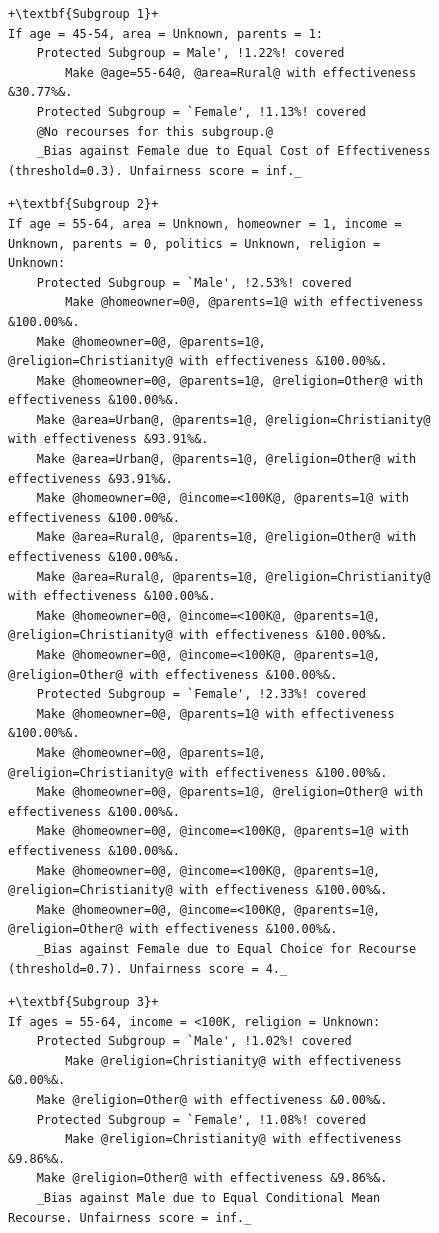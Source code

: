 \documentclass{article}
\begin{document}
\begin{figure}[ht]
\centering
\begin{minipage}{1\linewidth}
\begin{lstlisting}[style = base,escapechar=+]
+\textbf{Subgroup 1}+
If age = 45-54, area = Unknown, parents = 1:
    Protected Subgroup = Male', !1.22%! covered
        Make @age=55-64@, @area=Rural@ with effectiveness &30.77%&.
    Protected Subgroup = `Female', !1.13%! covered
	@No recourses for this subgroup.@
    _Bias against Female due to Equal Cost of Effectiveness (threshold=0.3). Unfairness score = inf._
\end{lstlisting}

\begin{lstlisting}[style = base,escapechar=+]
+\textbf{Subgroup 2}+
If age = 55-64, area = Unknown, homeowner = 1, income = Unknown, parents = 0, politics = Unknown, religion = Unknown:
    Protected Subgroup = `Male', !2.53%! covered
        Make @homeowner=0@, @parents=1@ with effectiveness &100.00%&.
	Make @homeowner=0@, @parents=1@, @religion=Christianity@ with effectiveness &100.00%&.
	Make @homeowner=0@, @parents=1@, @religion=Other@ with effectiveness &100.00%&.
	Make @area=Urban@, @parents=1@, @religion=Christianity@ with effectiveness &93.91%&.
	Make @area=Urban@, @parents=1@, @religion=Other@ with effectiveness &93.91%&.
	Make @homeowner=0@, @income=<100K@, @parents=1@ with effectiveness &100.00%&.
	Make @area=Rural@, @parents=1@, @religion=Other@ with effectiveness &100.00%&.
	Make @area=Rural@, @parents=1@, @religion=Christianity@ with effectiveness &100.00%&.
	Make @homeowner=0@, @income=<100K@, @parents=1@, @religion=Christianity@ with effectiveness &100.00%&.
	Make @homeowner=0@, @income=<100K@, @parents=1@, @religion=Other@ with effectiveness &100.00%&.
    Protected Subgroup = `Female', !2.33%! covered
	Make @homeowner=0@, @parents=1@ with effectiveness &100.00%&.
	Make @homeowner=0@, @parents=1@, @religion=Christianity@ with effectiveness &100.00%&.
	Make @homeowner=0@, @parents=1@, @religion=Other@ with effectiveness &100.00%&.
	Make @homeowner=0@, @income=<100K@, @parents=1@ with effectiveness &100.00%&.
	Make @homeowner=0@, @income=<100K@, @parents=1@, @religion=Christianity@ with effectiveness &100.00%&.
	Make @homeowner=0@, @income=<100K@, @parents=1@, @religion=Other@ with effectiveness &100.00%&.
    _Bias against Female due to Equal Choice for Recourse (threshold=0.7). Unfairness score = 4._
\end{lstlisting}

\begin{lstlisting}[style = base,escapechar=+]
+\textbf{Subgroup 3}+
If ages = 55-64, income = <100K, religion = Unknown:
    Protected Subgroup = `Male', !1.02%! covered
        Make @religion=Christianity@ with effectiveness &0.00%&.
	Make @religion=Other@ with effectiveness &0.00%&.
    Protected Subgroup = `Female', !1.08%! covered
        Make @religion=Christianity@ with effectiveness &9.86%&.
	Make @religion=Other@ with effectiveness &9.86%&.
    _Bias against Male due to Equal Conditional Mean Recourse. Unfairness score = inf._
\end{lstlisting}


\end{minipage}
\end{figure}
\end{document}
